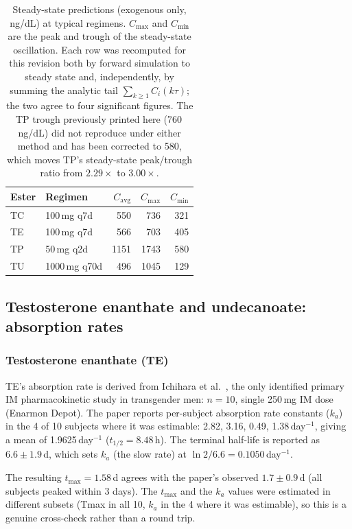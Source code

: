 \documentclass[11pt,a4paper]{article}
\begin{document}
\begin{table}[h]
\centering
\small
\begin{tabular}{@{}llrrr@{}}
\toprule
\textbf{Ester} & \textbf{Regimen} & $C_{\mathrm{avg}}$ & $C_{\max}$ & $C_{\min}$ \\
\midrule
TC & 100\,mg q7d   & 550 & 736 & 321 \\
TE & 100\,mg q7d   & 566 & 703 & 405 \\
TP & 50\,mg q2d    & 1151 & 1743 & 580 \\
TU & 1000\,mg q70d & 496 & 1045 & 129 \\
\bottomrule
\end{tabular}
\caption{Steady-state predictions (exogenous only, ng/dL) at typical
regimens. $C_{\max}$ and $C_{\min}$ are the peak and trough of the
steady-state oscillation. Each row was recomputed for this revision both by
forward simulation to steady state and, independently, by summing the
analytic tail $\sum_{k\ge 1} C_i(k\tau)$; the two agree to four significant
figures. The TP trough previously printed here (760\,ng/dL) did not
reproduce under either method and has been corrected to 580, which moves
TP's steady-state peak/trough ratio from $2.29\times$ to $3.00\times$.}
\label{tab:steady_state}
\end{table}

\subsection{Testosterone enanthate and undecanoate: absorption rates}
\label{sec:te_tu}

\subsubsection{Testosterone enanthate (TE)}

TE's absorption rate is derived from Ichihara et al.~\cite{ichihara2020},
the only identified primary IM pharmacokinetic study in transgender men:
$n=10$, single 250\,mg IM dose (Enarmon Depot). The paper reports
per-subject absorption rate constants ($k_a$) in the 4 of 10 subjects
where it was estimable: 2.82, 3.16, 0.49, 1.38\,day$^{-1}$, giving a
mean of 1.9625\,day$^{-1}$ ($t_{1/2} = 8.48$\,h). The terminal half-life
is reported as $6.6 \pm 1.9$\,d, which sets $k_a$ (the slow rate) at
$\ln 2 / 6.6 = 0.1050$\,day$^{-1}$.

The resulting $t_{\max} = 1.58$\,d agrees with the paper's observed
$1.7 \pm 0.9$\,d (all subjects peaked within 3 days). The $t_{\max}$
and the $k_a$ values were estimated in different subsets (Tmax in all
10, $k_a$ in the 4 where it was estimable), so this is a genuine
cross-check rather than a round trip.
\end{document}
